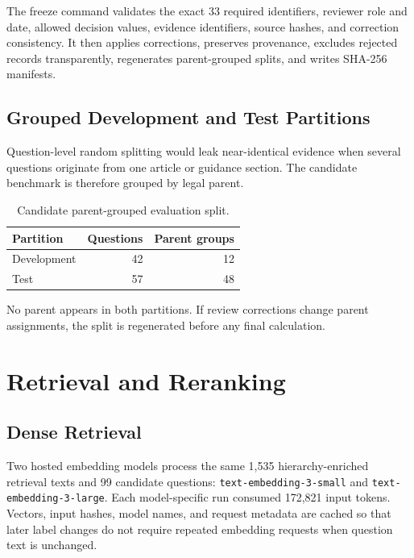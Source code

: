 The freeze command validates the exact 33 required identifiers, reviewer role and date, allowed decision values, evidence identifiers, source hashes, and correction consistency. It then applies corrections, preserves provenance, excludes rejected records transparently, regenerates parent-grouped splits, and writes SHA-256 manifests.


\subsection{Grouped Development and Test Partitions}

Question-level random splitting would leak near-identical evidence when several questions originate from one article or guidance section. The candidate benchmark is therefore grouped by legal parent.

\begin{table}[htbp]
  \centering
  \caption{Candidate parent-grouped evaluation split.}
  \label{tab:split}
  \begin{tabular}{lrr}
    \toprule
    \textbf{Partition} & \textbf{Questions} & \textbf{Parent groups} \\
    \midrule
    Development & 42 & 12 \\
    Test & 57 & 48 \\
    \bottomrule
  \end{tabular}
\end{table}

No parent appears in both partitions. If review corrections change parent assignments, the split is regenerated before any final calculation.

\section{Retrieval and Reranking}

\subsection{Dense Retrieval}

Two hosted embedding models process the same 1,535 hierarchy-enriched retrieval texts and 99 candidate questions: \texttt{text-embedding-3-small} and \texttt{text-embedding-3-large}. Each model-specific run consumed 172,821 input tokens. Vectors, input hashes, model names, and request metadata are cached so that later label changes do not require repeated embedding requests when question text is unchanged.

